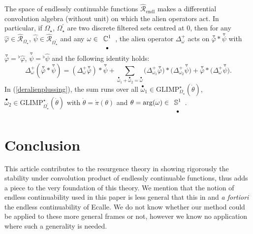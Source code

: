 \documentclass[11pt, english]{smfart}
\theoremstyle{definition}
\begin{document}
\begin{coro}
The space of endlessly continuable functions
$\hat{\mathscr{R}}_{\mathrm{endl}}$ makes a differential convolution
algebra (without unit) on which the alien operators act. In
particular, if $\Omega_\star$, $\Omega_\star^\prime$ are two discrete
filtered sets centred at $0$, then for any  $\widehat{\varphi} \in
\widehat{\mathscr{R}}_{\Omega_\star}$, $\widehat{\psi} \in
\widehat{\mathscr{R}}_{\Omega_\star^\prime}$ and 
any $\omega \in  
\begin{array}[t]{c}
\displaystyle \mathbb{C}^1\\
{\scriptstyle \bullet}
\end{array}
$, 
 the alien operator
$\Delta_{\omega}^+$ acts on
$\stackrel{\triangledown}{\varphi}\ast
\stackrel{\triangledown}{\psi}$ with
$\stackrel{\triangledown}{\varphi} =
\!^\flat\widehat{\varphi}$, $\stackrel{\triangledown}{\psi} =
\!^\flat\widehat{\psi}$ and the following identity holds:
\begin{equation}\label{deralienplussing}
\Delta_{\omega}^+ (\stackrel{\triangledown}{\varphi} \ast \stackrel{\triangledown}{\psi} )=
(\Delta_{\omega}^+ \stackrel{\triangledown}{\varphi} )
\ast \stackrel{\triangledown}{\psi}
+\sum_{{ {\stackrel{\bullet}{\omega}} }_1+{ {\stackrel{\bullet}{\omega}} }_2={ {\stackrel{\bullet}{\omega}} }}\big(\Delta_{\omega_1}^+
\stackrel{\triangledown}{\varphi}  
\big)\ast\big(\Delta_{\omega_2}^+ \stackrel{\triangledown}{\psi} \big)+
\stackrel{\triangledown}{\varphi} \ast \big(\Delta_{\omega}^+
\stackrel{\triangledown}{\psi} \big).
\end{equation}
In (\ref{deralienplussing}), the sum runs over all ${ {\stackrel{\bullet}{\omega}} }_1 \in
\mathrm{GLIMP}_{\Omega_\star}^\star({ {\dot{\theta}} })$,  
${ {\stackrel{\bullet}{\omega}} }_2 \in
\mathrm{GLIMP}_{\Omega_\star^\prime}^\star({ {\dot{\theta}} })$ with ${ {\dot{\theta}} }
= \dot{\pi}(\theta)$ and  $\theta = \mathrm{arg}(\omega)
\in 
\begin{array}[t]{c}
\displaystyle \mathbb{S}^1\\
{\scriptstyle \bullet}
\end{array}
$.
\end{coro}

\section{Conclusion}\label{Hend}

This article contributes to the resurgence theory in showing
rigorously the stability under convolution product 
of endlessly continuable functions, thus adds a
piece to the very foundation of this theory. We mention
that the notion of endless continuability used in this paper is less general that this
in \cite{CNP1} and \textit{a fortiori}  the endless continuability of
Ecalle.  We do not know whether our method could be applied to these
more general frames or not, however we know no application where such a generality
is needed. 
\end{document}
